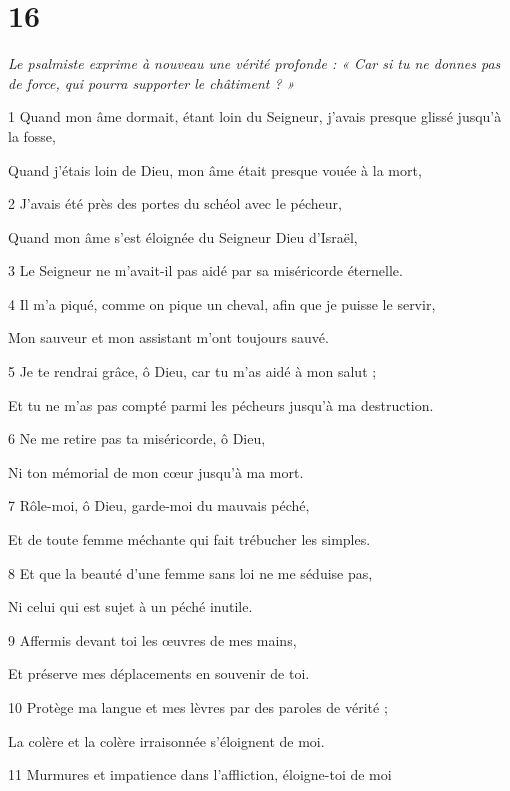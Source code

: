 \chapter{16}

\par \textit{Le psalmiste exprime à nouveau une vérité profonde : « Car si tu ne donnes pas de force, qui pourra supporter le châtiment ? »}

\par 1 Quand mon âme dormait, étant loin du Seigneur, j'avais presque glissé jusqu'à la fosse,
\par     Quand j'étais loin de Dieu, mon âme était presque vouée à la mort,
\par 2 J'avais été près des portes du schéol avec le pécheur,
\par     Quand mon âme s'est éloignée du Seigneur Dieu d'Israël,
\par 3 Le Seigneur ne m'avait-il pas aidé par sa miséricorde éternelle.
\par   
\par 4 Il m'a piqué, comme on pique un cheval, afin que je puisse le servir,
\par     Mon sauveur et mon assistant m'ont toujours sauvé.
\par 5 Je te rendrai grâce, ô Dieu, car tu m'as aidé à mon salut ;
\par     Et tu ne m'as pas compté parmi les pécheurs jusqu'à ma destruction.
\par 6 Ne me retire pas ta miséricorde, ô Dieu,
\par     Ni ton mémorial de mon cœur jusqu'à ma mort.
\par 7 Rôle-moi, ô Dieu, garde-moi du mauvais péché,
\par     Et de toute femme méchante qui fait trébucher les simples.
\par 8 Et que la beauté d'une femme sans loi ne me séduise pas,
\par     Ni celui qui est sujet à un péché inutile.
\par   
\par 9 Affermis devant toi les œuvres de mes mains,
\par     Et préserve mes déplacements en souvenir de toi.
\par 10 Protège ma langue et mes lèvres par des paroles de vérité ;
\par     La colère et la colère irraisonnée s'éloignent de moi.
\par 11 Murmures et impatience dans l'affliction, éloigne-toi de moi
